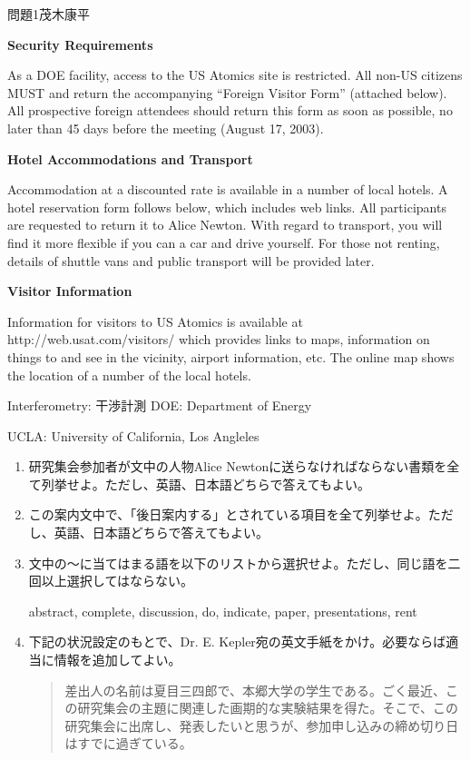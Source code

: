 \documentclass[fleqn]{jbook}
\begin{document}
\begin{question}{問題1}{茂木康平}
{{\bf Security Requirements}

As a DOE facility, access to the US Atomics site is restricted. All non-US citizens MUST  and return the accompanying ``Foreign Visitor Form'' (attached below). All prospective foreign attendees should return this form as soon as possible, no later than 45 days before the meeting (August 17, 2003).

{\bf Hotel Accommodations and Transport}

Accommodation at a discounted rate is available in a number of local hotels. A hotel reservation form follows below, which includes web links. All participants are requested to return it to Alice Newton. With regard to transport, you will find it more flexible if you can  a car and drive yourself. For those not renting, details of shuttle vans and public transport will be provided later.

{\bf Visitor Information}

Information for visitors to US Atomics is available at http://web.usat.com/visitors/ which provides links to maps, information on things to  and see in the vicinity, airport information, etc. The online map shows the location of a number of the local hotels.
}

\vspace{3mm}
{\parindent 8mm
Interferometry: 干渉計測 \qquad DOE: Department of Energy

UCLA: University of California, Los Angleles
}
\vspace{5mm}

\begin{enumerate}
    \item 研究集会参加者が文中の人物Alice Newtonに送らなければならない書類を全て列挙せよ。ただし、英語、日本語どちらで答えてもよい。

    \item この案内文中で、「後日案内する」とされている項目を全て列挙せよ。ただし、英語、日本語どちらで答えてもよい。

    \item 文中の〜に当てはまる語を以下のリストから選択せよ。ただし、同じ語を二回以上選択してはならない。

abstract, \quad complete, \quad discussion, \quad do, \quad indicate, \quad paper, \quad presentations, \quad rent

    \item 下記の状況設定のもとで、Dr. E. Kepler宛の英文手紙をかけ。必要ならば適当に情報を追加してよい。

\begin{quotation}
    差出人の名前は夏目三四郎で、本郷大学の学生である。ごく最近、この研究集会の主題に関連した画期的な実験結果を得た。そこで、この研究集会に出席し、発表したいと思うが、参加申し込みの締め切り日はすでに過ぎている。
\end{quotation}
\end{enumerate}
\end{question}
\end{document}
